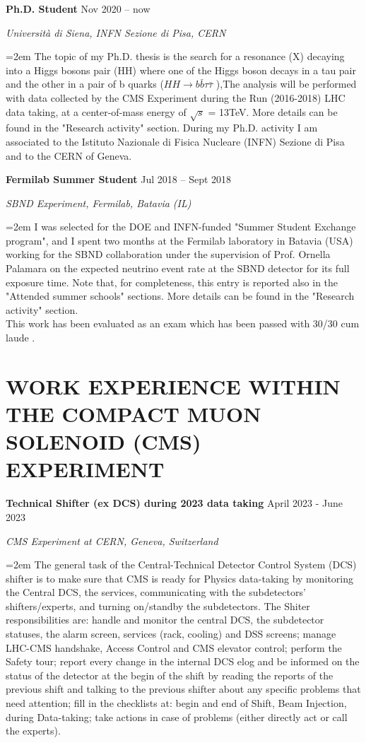 \documentclass[paper=a4,fontsize=12pt]{article} %
\newcommand{\hhbbtt}{$ HH \rightarrow b\bar{b}\tau\bar{\tau}$ }
\newcommand{\sepspace}{\vspace*{1em}}		%
\newcommand{\NewPart}[1]{\section*{\uppercase{#1}}}
\newcommand{\EducationEntry}[4]{
	\noindent \textbf{#1} \hfill      %
	{#2} \par  %
	\noindent \textit{#3} \par        %
	\noindent\hangindent=2em\hangafter=0 \small #4 %
	\normalsize \par}
\begin{document}
    \sepspace 
	\EducationEntry{Ph.D. Student }{Nov 2020 -- now}{Università di Siena, INFN Sezione di Pisa, CERN}{The topic of my Ph.D. thesis is the search for a resonance (X) decaying into a Higgs bosons pair (HH) where one of the Higgs boson decays in a tau pair and the other in a pair of b quarks (\hhbbtt),The analysis will be performed with data collected by the CMS Experiment during the Run\;2 (2016-2018) LHC data taking, at a center-of-mass energy of $\sqrt{s}$ = 13TeV. More details can be found in the "Research activity" section. During my Ph.D. activity I am associated to the Istituto Nazionale di Fisica Nucleare (INFN) Sezione di Pisa and to the CERN of Geneva.}
    \sepspace      
	\EducationEntry{Fermilab Summer Student}{Jul 2018 -- Sept 2018}{SBND Experiment, Fermilab, Batavia (IL)}{I was selected for the DOE and INFN-funded "Summer Student Exchange program", and I spent two months at the Fermilab laboratory in Batavia (USA) working for the SBND collaboration under the supervision of Prof. Ornella Palamara on the expected neutrino event rate at the SBND detector for its full exposure time. Note that, for completeness, this entry is reported also in the "Attended summer schools" sections. More details can be found in the "Research activity" section.\\ \noindent This work has been evaluated as an exam which has been passed with 30/30 cum laude \cite{partecip_fermilab}.} 
    \sepspace
 
	\NewPart{Work Experience within the Compact Muon Solenoid (CMS) experiment}
	\EducationEntry{Technical Shifter (ex DCS) during 2023 data taking}{April 2023 - June 2023}{CMS Experiment at CERN, Geneva, Switzerland}{The general task of the Central-Technical Detector Control System (DCS) shifter is to make sure that CMS is ready for Physics data-taking by monitoring the Central DCS, the services, communicating with the subdetectors' shifters/experts, and turning on/standby the subdetectors. The Shiter responsibilities are: handle and monitor the central DCS, the subdetector statuses, the alarm screen, services (rack, cooling) and DSS screens; manage LHC-CMS handshake, Access Control and CMS elevator control; perform the Safety tour; report every change in the internal DCS elog and be informed on the status of the detector at the begin of the shift by reading the reports of the previous shift and talking to the previous shifter about any specific problems that need attention; fill in the checklists at: begin and end of Shift, Beam Injection, during Data-taking; take actions in case of problems (either directly act or call the experts).}
\end{document}
